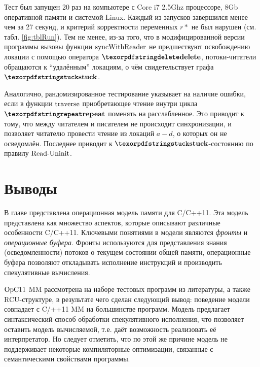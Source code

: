 Тест был запущен 20 раз на компьютере с Core i7 2.5Ghz процессоре, 8Gb оперативной памяти и системой Linux.
Каждый из запусков завершился менее чем за 27 секунд, и критерий корректности переменных $r*$ не был нарушен
(см. табл. \ref{fig:tblRun}). Тем не менее, из-за того, что в модифицированной версии программы
вызовы функции ${\rm syncWithReader}$ не предшествуют освобождению
локации с помощью оператора $\kw{delete}$, потоки-читатели
обращаются к ``удалённым'' локациям, о чём свидетельствует графа $\kw{stuck}$.

Аналогично, рандомизированное тестирование указывает на наличие ошибки, если в функции ${\rm traverse}$
приобретающее чтение внутри цикла $\kw{repeat}$ поменять на расслабленное. Это приводит к тому, что между
читателем и писателем не происходит синхронизации, и позволяет читателю провести чтение из локаций $a-d$,
о которых он не осведомлён. Последнее приводит к $\kw{stuck}$-состоянию по правилу ${\rm Read\text{-}Uninit}$.

\section{Выводы}
\label{sec:opc11:results}
В главе представлена операционная модель памяти для C/C++11.
Эта модель представлена как множество аспектов, которые описывают различные особенности
C/C++11.
Ключевыми понятиями в модели являются \emph{фронты} и \emph{операционные буфера}.
Фронты используются для представления знания (осведомленности) потоков
о текущем состоянии общей памяти,
операционные буфера позволяют откладывать исполнение инструкций и
производить спекулятивные вычисления.

$\mathrm{OpC11}$ MM рассмотрена на наборе тестовых программ из литературы, а также RCU-структуре,
в результате чего сделан следующий вывод:
поведение модели совпадает с C/++11 MM на большинстве программ.
Модель предлагает синтаксический способ обработки спекулятивного исполнения, что
позволяет оставить модель вычисляемой, т.е. даёт возможность реализовать её интерпретатор.
Но следует отметить, что по этой же причине модель не поддерживает некоторые компиляторные оптимизации,
связанные с семантическими свойствами программы.
